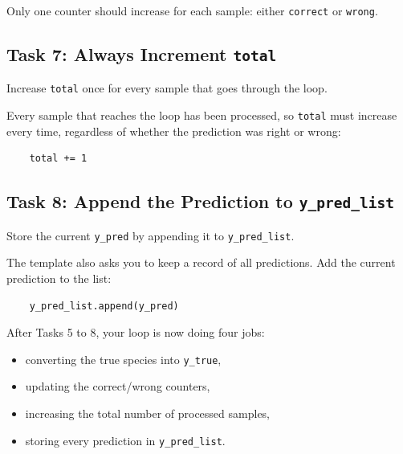 \begin{tcolorbox}[title=Task 6: Update correct or wrong counter]
Only one counter should increase for each sample: either \texttt{correct} or \texttt{wrong}.
\end{tcolorbox}

\subsection{Task 7: Always Increment \texttt{total}}
\begin{tcolorbox}[title=Task 7: ALWAYS increment total for every sample processed]
Increase \texttt{total} once for every sample that goes through the loop.
\end{tcolorbox}

Every sample that reaches the loop has been processed, so \texttt{total} must increase every time, regardless of whether the prediction was right or wrong:
\begin{verbatim}
    total += 1
\end{verbatim}

\subsection{Task 8: Append the Prediction to \texttt{y\_pred\_list}}
\begin{tcolorbox}[title=Task 8: Append the prediction to our list]
Store the current \texttt{y\_pred} by appending it to \texttt{y\_pred\_list}.
\end{tcolorbox}

The template also asks you to keep a record of all predictions. Add the current prediction to the list:
\begin{verbatim}
    y_pred_list.append(y_pred)
\end{verbatim}

\noindent
After Tasks 5 to 8, your loop is now doing four jobs:
\begin{itemize}
    \item converting the true species into \texttt{y\_true},
    \item updating the correct/wrong counters,
    \item increasing the total number of processed samples,
    \item storing every prediction in \texttt{y\_pred\_list}.
\end{itemize}

